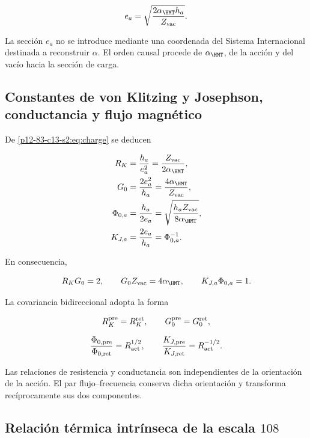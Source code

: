 \begin{equation}
e_a=\sqrt{\frac{2\alpha_{\HMT}h_a}{Z_{\rm vac}}}.
\label{p12-83-c13-s2:eq:charge}
\end{equation}

La secci\'on \(e_a\) no se introduce mediante una coordenada del Sistema
Internacional destinada a reconstruir \(\alpha\). El orden causal procede de
\(\alpha_{\HMT}\), de la acci\'on y del vac\'io hacia la secci\'on de carga.

\subsection{Constantes de von Klitzing y Josephson, conductancia y flujo magn\'etico}

De \cref{p12-83-c13-s2:eq:charge} se deducen

\begin{align}
R_K&=\frac{h_a}{e_a^2}=\frac{Z_{\rm vac}}{2\alpha_{\HMT}},
\label{p12-83-c13-s2:eq:rk}\\
G_0&=\frac{2e_a^2}{h_a}=\frac{4\alpha_{\HMT}}{Z_{\rm vac}},
\label{p12-83-c13-s2:eq:g0}\\
\Phi_{0,a}&=\frac{h_a}{2e_a}
=\sqrt{\frac{h_aZ_{\rm vac}}{8\alpha_{\HMT}}},
\label{p12-83-c13-s2:eq:phi0}\\
K_{J,a}&=\frac{2e_a}{h_a}=\Phi_{0,a}^{-1}.
\label{p12-83-c13-s2:eq:kj}
\end{align}

En consecuencia,

\begin{equation}
R_KG_0=2,\qquad G_0Z_{\rm vac}=4\alpha_{\HMT},
\qquad K_{J,a}\Phi_{0,a}=1.
\label{p12-83-c13-s2:eq:quantum-electrical-identities}
\end{equation}

La covariancia bidireccional adopta la forma

\[
R_K^{\rm pre}=R_K^{\rm ret},\qquad
G_0^{\rm pre}=G_0^{\rm ret},
\]

\[
\frac{\Phi_{0,\rm pre}}{\Phi_{0,\rm ret}}=R_{\rm act}^{1/2},
\qquad
\frac{K_{J,\rm pre}}{K_{J,\rm ret}}=R_{\rm act}^{-1/2}.
\]

Las relaciones de resistencia y conductancia son independientes de la
orientaci\'on de la acci\'on. El par flujo--frecuencia conserva dicha
orientaci\'on y transforma rec\'iprocamente sus dos componentes.

\subsection{Relaci\'on t\'ermica intr\'inseca de la escala \texorpdfstring{\(108\)}{108}}

